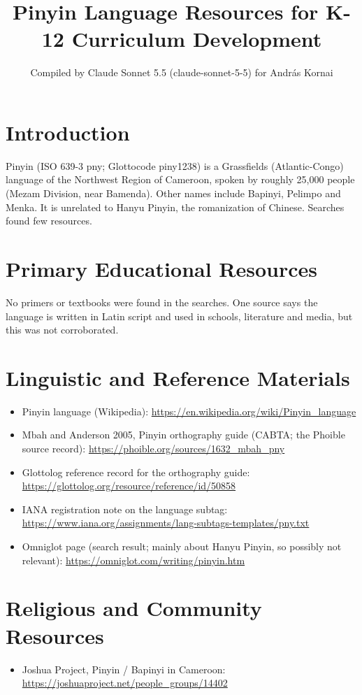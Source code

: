 \documentclass[12pt]{article}
\title{Pinyin Language Resources for K-12 Curriculum Development}
\author{Compiled by Claude Sonnet 5.5 (claude-sonnet-5-5) for Andr\'as Kornai}
\date{}
\begin{document}
\maketitle

\section{Introduction}
Pinyin (ISO 639-3 pny; Glottocode piny1238) is a Grassfields (Atlantic-Congo) language of the Northwest Region of Cameroon, spoken by roughly 25,000 people (Mezam Division, near Bamenda). Other names include Bapinyi, Pelimpo and Menka. It is unrelated to Hanyu Pinyin, the romanization of Chinese. Searches found few resources.

\section{Primary Educational Resources}
No primers or textbooks were found in the searches. One source says the language is written in Latin script and used in schools, literature and media, but this was not corroborated.

\section{Linguistic and Reference Materials}
\begin{itemize}
\item Pinyin language (Wikipedia): \url{https://en.wikipedia.org/wiki/Pinyin_language}
\item Mbah and Anderson 2005, Pinyin orthography guide (CABTA; the Phoible source record): \url{https://phoible.org/sources/1632_mbah_pny}
\item Glottolog reference record for the orthography guide: \url{https://glottolog.org/resource/reference/id/50858}
\item IANA registration note on the language subtag: \url{https://www.iana.org/assignments/lang-subtags-templates/pny.txt}
\item Omniglot page (search result; mainly about Hanyu Pinyin, so possibly not relevant): \url{https://omniglot.com/writing/pinyin.htm}
\end{itemize}

\section{Religious and Community Resources}
\begin{itemize}
\item Joshua Project, Pinyin / Bapinyi in Cameroon: \url{https://joshuaproject.net/people_groups/14402}
\end{itemize}
\end{document}
